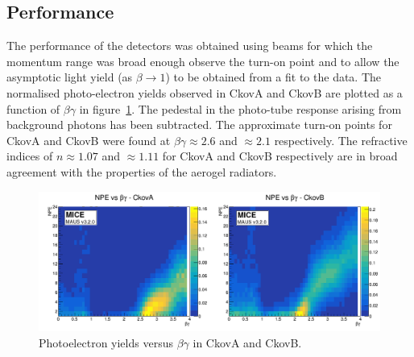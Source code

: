 \subsection{Performance}
\label{SubSect:Ckov_Performance}

The performance of the detectors was obtained using beams for which
the momentum range was broad enough observe the turn-on point and to
allow the asymptotic light yield (as $\beta \rightarrow 1$) to be
obtained from a fit to the data.
The normalised photo-electron yields observed in CkovA and CkovB are
plotted as a function of $\beta\gamma$ in
figure~\ref{fig:ckov_betagamma}.
The pedestal in the photo-tube response arising from background
photons has been subtracted.
The approximate turn-on points for CkovA and CkovB were found at
$\beta\gamma \approx 2.6$ and $\approx 2.1$ respectively.
The refractive indices of $n \approx 1.07$ and $\approx 1.11$ for
CkovA and CkovB respectively are in broad agreement with the
properties of the aerogel radiators. 
\begin{figure}
  \begin{center}
    \includegraphics[width=0.90\columnwidth]{./03-Ckov/Figures/scatter_betagamma_logo.png}
    \caption{Photoelectron yields versus $\beta\gamma$ in CkovA and CkovB.}
    \label{fig:ckov_betagamma}
  \end{center}
\end{figure}
